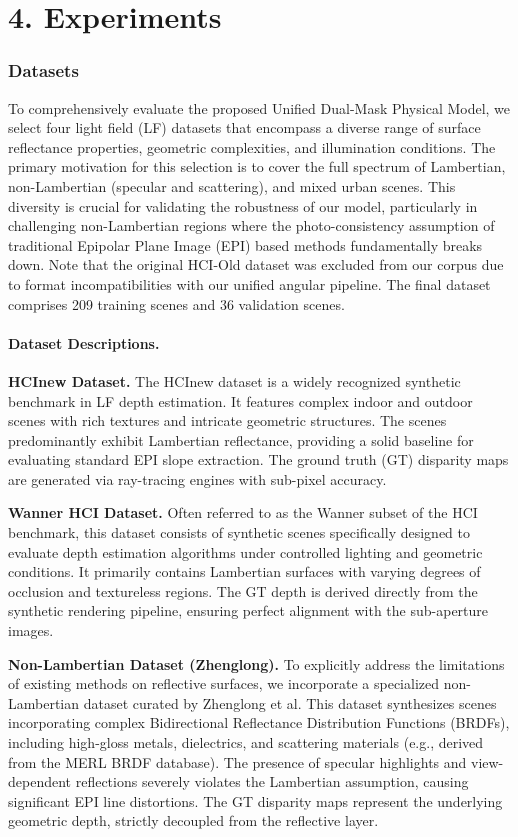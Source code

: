 \section{4. Experiments}

\subsubsection{Datasets}

To comprehensively evaluate the proposed Unified Dual-Mask Physical Model, we select four light field (LF) datasets that encompass a diverse range of surface reflectance properties, geometric complexities, and illumination conditions. The primary motivation for this selection is to cover the full spectrum of Lambertian, non-Lambertian (specular and scattering), and mixed urban scenes. This diversity is crucial for validating the robustness of our model, particularly in challenging non-Lambertian regions where the photo-consistency assumption of traditional Epipolar Plane Image (EPI) based methods fundamentally breaks down. Note that the original HCI-Old dataset was excluded from our corpus due to format incompatibilities with our unified angular pipeline. The final dataset comprises 209 training scenes and 36 validation scenes.

\paragraph{Dataset Descriptions.}

\textbf{HCInew Dataset.} The HCInew dataset is a widely recognized synthetic benchmark in LF depth estimation. It features complex indoor and outdoor scenes with rich textures and intricate geometric structures. The scenes predominantly exhibit Lambertian reflectance, providing a solid baseline for evaluating standard EPI slope extraction. The ground truth (GT) disparity maps are generated via ray-tracing engines with sub-pixel accuracy. 

\textbf{Wanner HCI Dataset.} Often referred to as the Wanner subset of the HCI benchmark, this dataset consists of synthetic scenes specifically designed to evaluate depth estimation algorithms under controlled lighting and geometric conditions. It primarily contains Lambertian surfaces with varying degrees of occlusion and textureless regions. The GT depth is derived directly from the synthetic rendering pipeline, ensuring perfect alignment with the sub-aperture images.

\textbf{Non-Lambertian Dataset (Zhenglong).} To explicitly address the limitations of existing methods on reflective surfaces, we incorporate a specialized non-Lambertian dataset curated by Zhenglong et al. This dataset synthesizes scenes incorporating complex Bidirectional Reflectance Distribution Functions (BRDFs), including high-gloss metals, dielectrics, and scattering materials (e.g., derived from the MERL BRDF database). The presence of specular highlights and view-dependent reflections severely violates the Lambertian assumption, causing significant EPI line distortions. The GT disparity maps represent the underlying geometric depth, strictly decoupled from the reflective layer.

